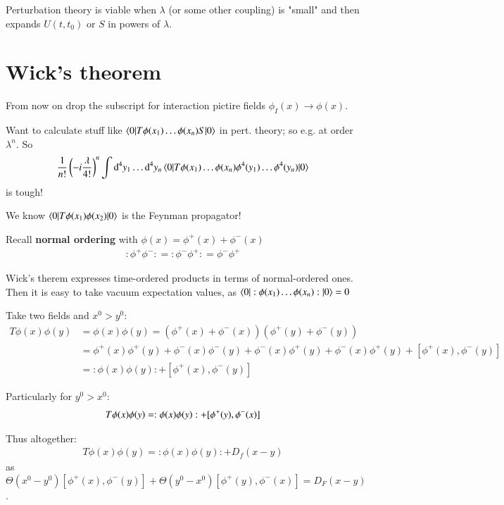 Perturbation theory is viable when $\lambda$ (or some other coupling) is "small" and then expands $U(t,t_0)$ or $S$ in powers of $\lambda$.

\section{Wick's theorem}
From now on drop the subscript for interaction pictire fields $\phi_I(x) \rightarrow \phi(x)$.

Want to calculate stuff like $\braket{0 | T\phi(x_1)\dots\phi(x_n)S | 0}$ in pert. theory; so e.g. at order $\lambda^n$. So 
\begin{align}
\frac{1}{n!} \left( -i\frac{\lambda}{4!} \right)^n \int \dd^4 y_1 \dots \dd^4 y_n \braket{0 | T\phi(x_1)\dots\phi(x_n)\phi^4(y_1)\dots\phi^4(y_n) | 0}
\end{align}
is tough!

We know $\braket{0 | T\phi(x_1)\phi(x_2) | 0 } $ is the Feynman propagator!

Recall \textbf{normal ordering} with $\phi(x) = \phi^+(x) + \phi^-(x)$
\begin{align}
	:\phi^+ \phi^-: = :\phi^- \phi^+: = \phi^- \phi^+
\end{align} 

Wick's therem expresses time-ordered products in terms of normal-ordered ones. Then it is easy to take vacuum expectation values, as $\braket{0 | :\phi(x_1)\dots\phi(x_n):|0} = 0$

Take two fields and $x^0 > y^0$:
\begin{align*}
	T \phi(x)\phi(y) &= \phi(x)\phi(y) = \left(\phi^+(x)+\phi^-(x)\right)\left(\phi^+(y)+\phi^-(y)\right) \\
	&= \phi^+(x)\phi^+(y) + \phi^-(x)\phi^-(y) + \phi^-(x) \phi^+(y) + \phi^-(x) \phi^+(y) + [\phi^+(x), \phi^-(y)] \\
	&= :\phi(x)\phi(y): + [\phi^+(x),\phi^-(y)]
\end{align*} 

Particularly for $y^0 > x^0$: 
\begin{align}
	T\phi(x)\phi(y) = :\phi(x)\phi(y): + [\phi^+(y),\phi^-(x)] \notag
\end{align}

Thus altogether: 
\begin{align}
	T\phi(x)\phi(y) = :\phi(x)\phi(y): + D_f(x-y)
\end{align}
as $\Theta(x^0 - y^0) [\phi^+(x), \phi^-(y)] + \Theta(y^0 - x^0) [\phi^+(y), \phi^-(x)] = D_F(x-y)$.

